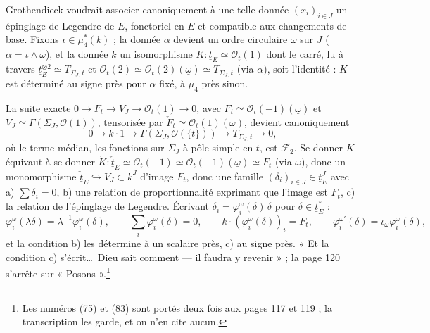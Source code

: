 \documentclass[11pt,a4paper]{article}
\begin{document}
Grothendieck voudrait associer canoniquement à une telle donnée $(x_i)_{i \in
J}$ un épinglage de Legendre de $E$, fonctoriel en $E$ et compatible aux
changements de base. Fixons $\iota \in \mu_4^{*}(k)$ ; la donnée $\alpha$
devient un ordre circulaire $\omega$ sur $J$ ($\alpha = \iota \wedge \omega$), et
la donnée $k$ un isomorphisme $K : \underline{t}_E \simeq \mathcal{O}_t(1)$ dont
le carré, lu à travers $\underline{t}_E^{\otimes 2} \simeq T_{\Sigma_J,t}$ et
$\mathcal{O}_t(2) \simeq \mathcal{O}_t(2)(\underline{\omega}) \simeq
T_{\Sigma_J,t}$ (via $\alpha$), soit l'identité : $K$ est déterminé au signe près
pour $\alpha$ fixé, à $\mu_4$ près sinon.

La suite exacte $0 \to F_t \to V_J \to \mathcal{O}_t(1) \to 0$, avec $F_t \simeq
\mathcal{O}_t(-1)(\underline{\omega})$ et $V_J \simeq \Gamma(\Sigma_J,
\mathcal{O}(1))$, tensorisée par $\check F_t \simeq
\mathcal{O}_t(1)(\underline{\omega})$, devient canoniquement
\[
0 \to k \cdot 1 \to \Gamma(\Sigma_J, \mathcal{O}(\{t\})) \to T_{\Sigma_J,t} \to
0,
\]
où le terme médian, les fonctions sur $\Sigma_J$ à pôle simple en $t$, est
$\mathcal{F}_2$. Se donner $K$ équivaut à se donner $\check K :
\check{\underline{t}}_E \simeq \mathcal{O}_t(-1) \simeq
\mathcal{O}_t(-1)(\underline{\omega}) \simeq F_t$ (via $\omega$), donc un
monomorphisme $\check{\underline{t}}_E \hookrightarrow V_J \subset k^J$ d'image
$F_t$, donc une famille $(\delta_i)_{i \in J} \in \underline{t}_E^J$ avec a)
$\sum \delta_i = 0$, b) une relation de proportionnalité exprimant que l'image
est $F_t$, c) la relation de l'épinglage de Legendre. Écrivant $\delta_i =
\varphi_i^{\omega}(\delta)\, \delta$ pour $\delta \in \underline{t}_E^{*}$ :
\[
\varphi_i^{\omega}(\lambda\delta) = \lambda^{-1} \varphi_i^{\omega}(\delta),
\qquad \sum_i \varphi_i^{\omega}(\delta) = 0, \qquad k \cdot
(\varphi_i^{\omega}(\delta))_i = F_t, \qquad \varphi_i^{\omega'}(\delta) =
\iota_\omega \varphi_i^{\omega}(\delta),
\]
et la condition b) les détermine à un scalaire près, c) au signe près. « Et la
condition c) s'écrit\ldots\ Dieu sait comment --- il faudra y revenir » ; la
page 120 s'arrête sur « Posons ».\footnote{Les numéros (75) et (83) sont portés
deux fois aux pages 117 et 119 ; la transcription les garde, et on n'en cite
aucun.}
\end{document}
